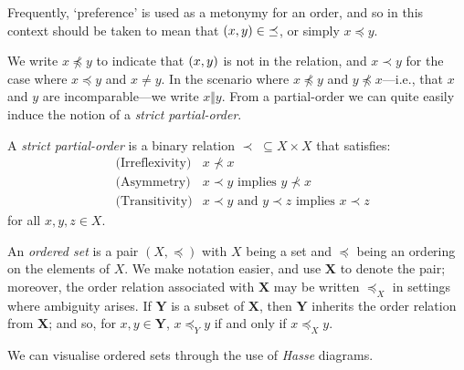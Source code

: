 Frequently, `preference' is used as a metonymy for an order, and so in this context  should be taken to mean that $(x,y) \in \; \preceq$, or simply $x \preceq y$.

We write $x \npreceq y$ to indicate that $(x,y)$ is not in the relation, and $x \prec y$ for the case where $x\preceq y$ and $x \not = y$. In the scenario where $x \not \preceq y$ and $y \not \preceq x$---i.e., that $x$ and $y$ are incomparable---we write $x \Vert y$. From a partial-order we can quite easily induce the notion of a \emph{strict partial-order}.

\begin{definition}
  \label{definition:strict-partial-order}
  A \textit{strict partial-order}  is a binary relation $\prec \; \subseteq X \times X$ that satisfies:
  \begin{align}
    & \text{(Irreflexivity)} & x \nprec x \\
    & \text{(Asymmetry)} & x \prec y \text{ implies } y \nprec x \\
    & \text{(Transitivity)} & x \prec y \text{ and } y \prec z \text{ implies } x \prec z
  \end{align}
  for all $x,y,z \in X$.
\end{definition}

An \textit{ordered set} is a pair $(X, \preceq)$ with $X$ being a set and $\preceq$ being an ordering on the elements of $X$. We make notation easier, and use $\mathbf{X}$ to denote the pair; moreover, the order relation associated with $\mathbf{X}$ may be written $\preceq_X$ in settings where ambiguity arises. If $\mathbf{Y}$ is a subset of $\mathbf{X}$, then $\mathbf{Y}$ inherits the order relation from $\mathbf{X}$; and so, for $x,y \in \mathbf{Y}$, $x \preceq_Y y$ if and only if $x \preceq_X y$.

We can visualise ordered sets through the use of \textit{Hasse} diagrams.

